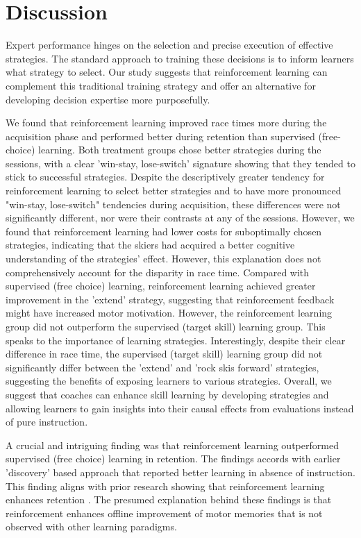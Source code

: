 \documentclass{article}
\begin{document}
\section{Discussion}

Expert performance hinges on the selection and precise execution of effective strategies. The standard approach to training these decisions is to inform learners what strategy to select. Our study suggests that reinforcement learning can complement this traditional training strategy and offer an alternative for developing decision expertise more purposefully.

We found that reinforcement learning improved race times more during the acquisition phase and performed better during retention than supervised (free-choice) learning. Both treatment groups chose better strategies during the sessions, with a clear 'win-stay, lose-switch' signature showing that they tended to stick to successful strategies. Despite the descriptively greater tendency for reinforcement learning to select better strategies and to have more pronounced "win-stay, lose-switch" tendencies during acquisition, these differences were not significantly different, nor were their contrasts at any of the sessions. However, we found that reinforcement learning had lower costs for suboptimally chosen strategies, indicating that the skiers had acquired a better cognitive understanding of the strategies' effect. However, this explanation does not comprehensively account for the disparity in race time. Compared with supervised (free choice) learning, reinforcement learning achieved greater improvement in the 'extend' strategy, suggesting that reinforcement feedback might have increased motor motivation. However, the reinforcement learning group did not outperform the supervised (target skill) learning group. This speaks to the importance of learning strategies. Interestingly, despite their clear difference in race time, the supervised (target skill) learning group did not significantly differ between the 'extend' and 'rock skis forward' strategies, suggesting the benefits of exposing learners to various strategies. Overall, we suggest that coaches can enhance skill learning by developing strategies and allowing learners to gain insights into their causal effects from evaluations instead of pure instruction.

A crucial and intriguing finding was that reinforcement learning outperformed supervised (free choice) learning in retention. The findings accords with earlier 'discovery' based approach that reported better learning in absence of instruction. This finding aligns with prior research showing that reinforcement learning enhances retention \cite{smuilof, 2002}. The presumed explanation behind these findings is that reinforcement enhances offline improvement of motor memories that is not observed with other learning paradigms. 
\end{document}
